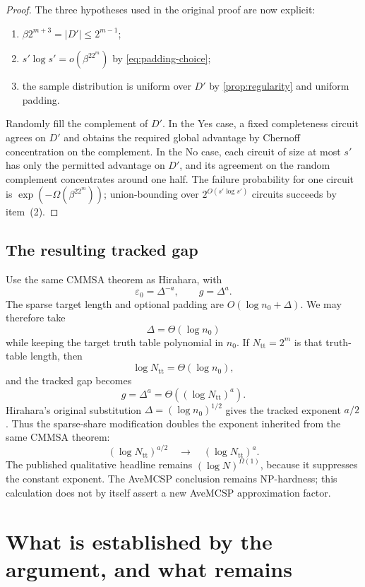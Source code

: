 \documentclass[11pt]{article}
\theoremstyle{definition}
\newcommand{\eps}{\varepsilon}
\begin{document}
\begin{proof}
The three hypotheses used in the original proof are now explicit:
\begin{enumerate}[label=(\arabic*)]
\item $\beta2^{m+3}=|D'|\le2^{m-1}$;
\item $s'\log s'=o(\beta^22^m)$ by \eqref{eq:padding-choice};
\item the sample distribution is uniform over $D'$ by \cref{prop:regularity} and uniform padding.
\end{enumerate}
Randomly fill the complement of $D'$.  In the Yes case, a fixed completeness circuit agrees on $D'$ and obtains the required global advantage by Chernoff concentration on the complement.  In the No case, each circuit of size at most $s'$ has only the permitted advantage on $D'$, and its agreement on the random complement concentrates around one half.  The failure probability for one circuit is $\exp(-\Omega(\beta^22^m))$; union-bounding over $2^{O(s'\log s')}$ circuits succeeds by item~(2).
\end{proof}

\subsection{The resulting tracked gap}

Use the same CMMSA theorem as Hirahara, with
\[
 \eps_0=\Delta^{-a},
 \qquad
 g=\Delta^a.
\]
The sparse target length and optional padding are $O(\log n_0+\Delta)$.  We may therefore take
\[
 \Delta=\Theta(\log n_0)
\]
while keeping the target truth table polynomial in $n_0$.  If $N_{\mathrm{tt}}=2^m$ is that truth-table length, then
\[
 \log N_{\mathrm{tt}}=\Theta(\log n_0),
\]
and the tracked gap becomes
\[
 g=\Delta^a=\Theta((\log N_{\mathrm{tt}})^a).
\]
Hirahara's original substitution $\Delta=(\log n_0)^{1/2}$ gives the tracked exponent $a/2$.  Thus the sparse-share modification doubles the exponent inherited from the same CMMSA theorem:
\[
 (\log N_{\mathrm{tt}})^{a/2}
 \quad\longrightarrow\quad
 (\log N_{\mathrm{tt}})^a.
\]
The published qualitative headline remains $(\log N)^{\Omega(1)}$, because it suppresses the constant exponent.  The AveMCSP conclusion remains NP-hardness; this calculation does not by itself assert a new AveMCSP approximation factor.

\section{What is established by the argument, and what remains}
\end{document}
